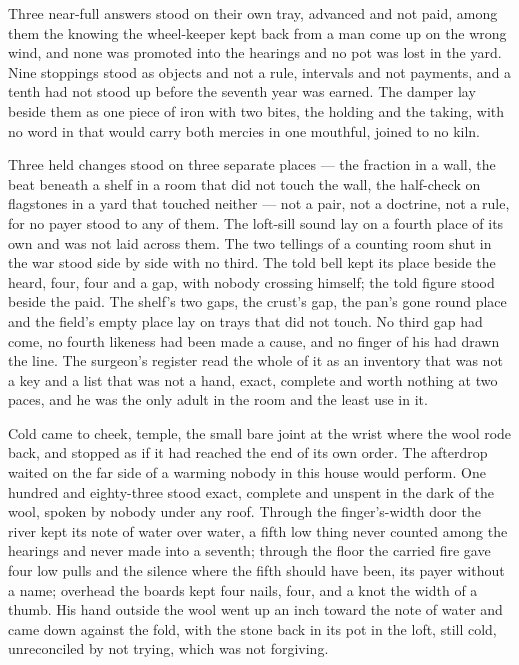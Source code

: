 Three near-full answers stood on their own tray, advanced and not paid, among them the knowing the wheel-keeper kept back from a man come up on the wrong wind, and none was promoted into the hearings and no pot was lost in the yard. Nine stoppings stood as objects and not a rule, intervals and not payments, and a tenth had not stood up before the seventh year was earned. The damper lay beside them as one piece of iron with two bites, the holding and the taking, with no word in  that would carry both mercies in one mouthful, joined to no kiln.

Three held changes stood on three separate places — the fraction in a wall, the beat beneath a shelf in a room that did not touch the wall, the half-check on flagstones in a yard that touched neither — not a pair, not a doctrine, not a rule, for no payer stood to any of them. The loft-sill sound lay on a fourth place of its own and was not laid across them. The two tellings of a counting room shut in the war stood side by side with no third. The told bell kept its place beside the heard, four, four and a gap, with nobody crossing himself; the told figure stood beside the paid. The shelf's two gaps, the crust's gap, the pan's gone round place and the field's empty place lay on trays that did not touch. No third gap had come, no fourth likeness had been made a cause, and no finger of his had drawn the line. The surgeon's register read the whole of it as an inventory that was not a key and a list that was not a hand, exact, complete and worth nothing at two paces, and he was the only adult in the room and the least use in it.

Cold came to cheek, temple, the small bare joint at the wrist where the wool rode back, and stopped as if it had reached the end of its own order. The afterdrop waited on the far side of a warming nobody in this house would perform. One hundred and eighty-three stood exact, complete and unspent in the dark of the wool, spoken by nobody under any roof. Through the finger's-width door the river kept its note of water over water, a fifth low thing never counted among the hearings and never made into a seventh; through the floor the carried fire gave four low pulls and the silence where the fifth should have been, its payer without a name; overhead the boards kept four nails, four, and a knot the width of a thumb. His hand outside the wool went up an inch toward the note of water and came down against the fold, with the stone back in its pot in the loft, still cold, unreconciled by not trying, which was not forgiving.
